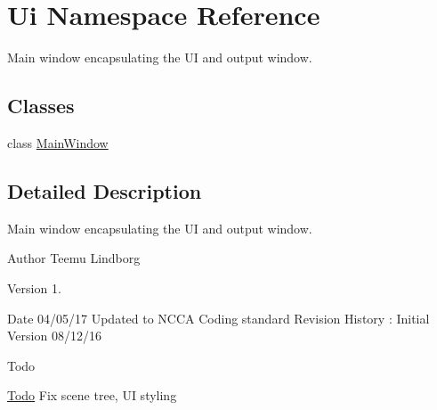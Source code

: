 \hypertarget{namespaceUi}{\section{Ui Namespace Reference}
\label{namespaceUi}
}


Main window encapsulating the U\-I and output window.  


\subsection*{Classes}
\begin{DoxyCompactItemize}
\item 
class \hyperlink{classUi_1_1MainWindow}{Main\-Window}
\end{DoxyCompactItemize}


\subsection{Detailed Description}
Main window encapsulating the U\-I and output window. \begin{DoxyAuthor}{Author}
Teemu Lindborg 
\end{DoxyAuthor}
\begin{DoxyVersion}{Version}
1. 
\end{DoxyVersion}
\begin{DoxyDate}{Date}
04/05/17 Updated to N\-C\-C\-A Coding standard Revision History \-: Initial Version 08/12/16 
\end{DoxyDate}
\begin{DoxyRefDesc}{Todo}
\item[\hyperlink{todo__todo000009}{Todo}]Fix scene tree, U\-I styling \end{DoxyRefDesc}
